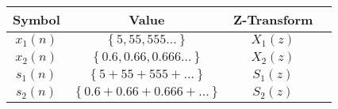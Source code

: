 \begin{tabular}{|c|c|c|c|}
    \hline
     \textbf{Symbol} & \textbf{Value} &\textbf{Z-Transform}\\
    \hline
     $x_1(n)$ & $\left\{5,55,555...\right\}$&
$X_1(z)$ \\[6pt]
    \hline
     $x_2(n)$ & $\left\{0.6,0.66,0.666...\right\}$&$X_2(z)$ \\[6pt]
   \hline
     $s_1(n)$ & $\left\{5+55+555+...\right\}$&
$S_1(z)$ \\[6pt]
     \hline
     $s_2(n)$ & $\left\{0.6+0.66+0.666+...\right\}$&$S_2(z)$ \\[6pt]
    \hline
\end{tabular}
